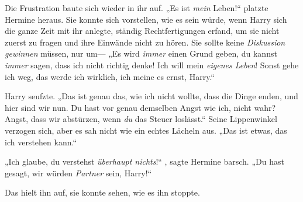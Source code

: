 Die Frustration baute sich wieder in ihr auf. „Es ist \emph{mein} Leben!“ platzte Hermine heraus. Sie konnte sich vorstellen, wie es sein würde, wenn Harry sich die ganze Zeit mit ihr anlegte, ständig Rechtfertigungen erfand, um sie nicht zuerst zu fragen und ihre Einwände nicht zu hören. Sie sollte keine \emph{Diskussion gewinnen} müssen, nur um— „Es wird \emph{immer} einen Grund geben, du kannst \emph{immer} sagen, dass ich nicht richtig denke! Ich will mein \emph{eigenes Leben}! Sonst gehe ich weg, das werde ich wirklich, ich meine es ernst, Harry.“

Harry seufzte. „Das ist genau das, wie ich nicht wollte, dass die Dinge enden, und hier sind wir nun. Du hast vor genau demselben Angst wie ich, nicht wahr? Angst, dass wir abstürzen, wenn \emph{du} das Steuer loslässt.“ Seine Lippenwinkel verzogen sich, aber es sah nicht wie ein echtes Lächeln aus. „Das ist etwas, das ich verstehen kann.“

„Ich glaube, du verstehst \emph{überhaupt nichts}!“ , sagte Hermine barsch. „Du hast gesagt, wir würden \emph{Partner} sein, Harry!“

Das hielt ihn auf, sie konnte sehen, wie es ihn stoppte.

